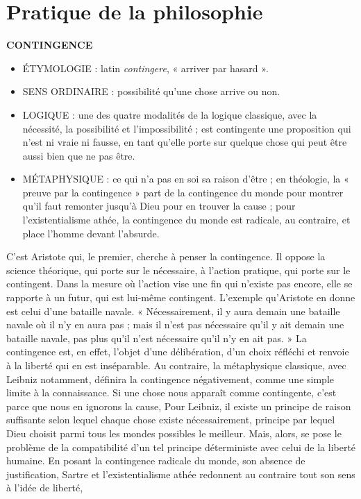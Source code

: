 
\section{Pratique de la philosophie}

{\bf CONTINGENCE}

\begin{itemize}[leftmargin=1cm, label=, itemsep=1pt]
\item {\footnotesize ÉTYMOLOGIE} : latin {\it contingere}, « arriver par hasard ».
\item {\footnotesize SENS ORDINAIRE} : possibilité qu'une chose
arrive ou non.
\item {\footnotesize LOGIQUE} : une des
quatre modalités de la logique classique, avec la nécessité, la possibilité et l'impossibilité ; est contingente une proposition qui n'est ni
vraie ni fausse, en tant qu'elle porte
sur quelque chose qui peut être
aussi bien que ne pas être.
\item {\footnotesize MÉTAPHYSIQUE} : ce qui n'a pas en soi sa
raison d'être ; en théologie, la
« preuve par la contingence » part
de la contingence du monde pour
montrer qu'il faut remonter jusqu’à
Dieu pour en trouver la cause ; pour
l'existentialisme athée, la contingence du monde est radicale, au
contraire, et place l'homme devant
l'absurde.
\end{itemize}

\vspace{0.35cm}
C’est Aristote qui, le premier, cherche à
penser la contingence. Il oppose la
science théorique, qui porte sur le nécessaire, à l’action pratique, qui porte sur
le contingent. Dans la mesure où l’action
vise une fin qui n'existe pas encore, elle
se rapporte à un futur, qui est lui-même
contingent. L'exemple qu'Aristote en
donne est celui d'une bataille navale.
« Nécessairement, il y aura demain une
bataille navale où il n'y en aura pas ;
mais il n'est pas nécessaire qu'il y ait
demain une bataille navale, pas plus
qu'il n'est nécessaire qu'il n'y en ait
pas. » La contingence est, en effet, l'objet
d’une délibération, d’un choix réfléchi et
renvoie à la liberté qui en est inséparable. Au contraire, la métaphysique
classique, avec Leibniz notamment,
définira la contingence négativement,
comme une simple limite à la connaissance. Si une chose nous apparaît
comme contingente, c'est parce que
nous en ignorons la cause, Pour Leibniz,
il existe un principe de raison suffisante
selon lequel chaque chose existe nécessairement, principe par lequel Dieu
choisit parmi tous les mondes possibles
le meilleur. Mais, alors, se pose le problème de la compatibilité d’un tel principe déterministe avec celui de la liberté
humaine. En posant la contingence radicale du monde, son absence de justification, Sartre et l’existentialisme athée
redonnent au contraire tout son sens à
l'idée de liberté,

